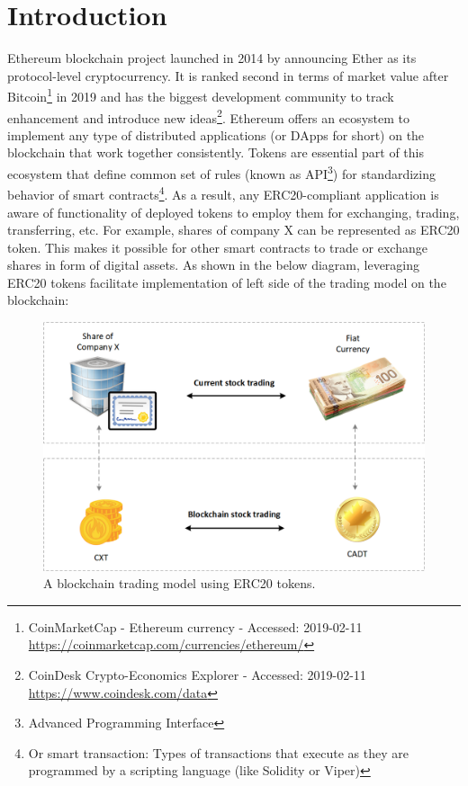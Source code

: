 
\section{Introduction}
Ethereum blockchain project\cite{Ref00} launched in 2014 by announcing Ether as its protocol-level cryptocurrency. It is ranked second in terms of market value after Bitcoin\footnote{CoinMarketCap - Ethereum currency - Accessed: 2019-02-11 \newline\url{https://coinmarketcap.com/currencies/ethereum/}} in 2019 and has the biggest development community to track enhancement and introduce new ideas\footnote{CoinDesk Crypto-Economics Explorer - Accessed: 2019-02-11 \newline\url{https://www.coindesk.com/data}}. Ethereum offers an ecosystem to implement any type of distributed applications (or DApps for short) on the blockchain that work together consistently. Tokens are essential part of this ecosystem that define common set of rules (known as API\footnote{Advanced Programming Interface}) for standardizing behavior of smart contracts\footnote{Or smart transaction: Types of transactions that execute as they are programmed by a scripting language (like Solidity or Viper)}. As a result, any ERC20-compliant application is aware of functionality of deployed tokens to employ them for exchanging, trading, transferring, etc. For example, shares of company X can be represented as ERC20 token. This makes it possible for other smart contracts to trade or exchange shares in form of digital assets. As shown in the below diagram, leveraging ERC20 tokens facilitate implementation of left side of the trading model on the blockchain:
\begin{figure}[H]
	\centering
	\includegraphics[width=1.0\linewidth]{figures/multiple_withdrawal_01.png}
	\caption{A blockchain trading model using ERC20 tokens.}
\end{figure}
